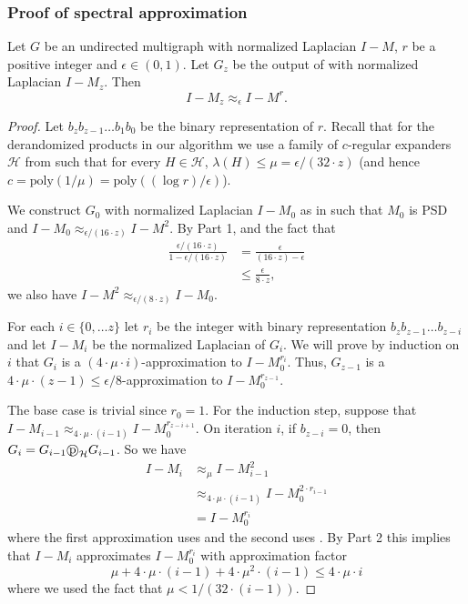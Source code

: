 \documentclass{toc}
\newcommand{\dpr}{\text{\textcircled{p}}_{\mathcal{H}}}
\numberwithin{myalgctr}{section}
\theoremstyle{named}
\begin{document}
%
\subsubsection{Proof of spectral approximation}
\begin{lemma}
\label{lem:pf_of_spec_approx}
Let $G$ be an undirected multigraph with normalized Laplacian $I-M$, $r$ be a positive integer and $\epsilon\in(0,1)$. Let $G_z$ be the output of  with normalized Laplacian $I-M_z$. Then
\[
I-M_z \approx_{\epsilon} I-M^r.
\]
\end{lemma}
\begin{proof}
Let $b_zb_{z-1}\ldots b_1 b_0$ be the binary representation of $r$. Recall that for the derandomized products in our algorithm we use a family of $c$-regular expanders $\mathcal{H}$ from  such that for every $H\in\mathcal{H}$, $\lambda(H)\leq\mu=\epsilon/(32\cdot z)$ (and hence $c=\mathrm{poly}(1/\mu)=\mathrm{poly}((\log r)/\epsilon)$).

We construct $G_0$ with normalized Laplacian $I-M_0$ as in  such that $M_0$ is PSD and $I-M_0 \approx_{\epsilon/(16\cdot z)}I-M^2$. By  Part 1, and the fact that 
\begin{align*}
\frac{\epsilon/(16\cdot z)}{1-\epsilon/(16\cdot z)}&=\frac{\epsilon}{(16\cdot z)-\epsilon}\\
&\leq \frac{\epsilon}{8\cdot z},
\end{align*}
we also have $I-M^2 \approx_{\epsilon/(8\cdot z)}I-M_0$.  

For each $i\in\{0,\ldots z\}$ let $r_i$ be the integer with binary representation $b_zb_{z-1}\ldots b_{z-i}$ and let $I-M_i$ be the normalized Laplacian of $G_i$. We will prove by induction on $i$ that $G_i$ is a $(4\cdot\mu\cdot i)$-approximation to $I-M_0^{r_i}$. Thus, $G_{z-1}$ is a $4\cdot\mu\cdot(z-1)\leq \epsilon/8$-approximation to $I-M_0^{r_{z-1}}$.

The base case is trivial since $r_0=1$. For the induction step, suppose that $I-M_{i-1}\approx_{4\cdot\mu\cdot (i-1)}I-M_{0}^{r_{z-i+1}}$. On iteration $i$, if $b_{z-i}=0$, then $G_{i}=G_{i-1}\dpr G_{i-1}$. So we have 
\begin{align*}
I-M_i &\approx_{\mu} I-M_{i-1}^2 \\
&\approx_{4\cdot\mu\cdot (i-1)} I-M_{0}^{2\cdot r_{i-1}}\\
&=I-M_0^{r_{i}}
\end{align*}
where the first approximation uses  and the second uses . By  Part 2 this implies that $I-M_i$ approximates $I-M_0^{r_{i}}$ with approximation factor 
\[
\mu +4\cdot\mu\cdot (i-1)+4\cdot\mu^2\cdot (i-1)\leq 4\cdot\mu\cdot i
\]
where we used the fact that $\mu<1/(32\cdot (i-1))$.


\end{proof}
\end{document}
